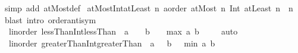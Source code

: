 \begin{isabellebody}
%
\isatagproof
{}\isamarkupfalse%
\ {\isacharparenleft}{\kern0pt}simp\ add{\isacharcolon}{\kern0pt}\ atMost{\isacharunderscore}{\kern0pt}def{\isacharparenright}{\kern0pt}%
\endisatagproof
{\isafoldproof}%
%
\isadelimproof
\isanewline
%
\endisadelimproof
\isanewline
{}\isamarkupfalse%
\ atMost{\isacharunderscore}{\kern0pt}Int{\isacharunderscore}{\kern0pt}atLeast{\isacharcolon}{\kern0pt}\ {\isachardoublequoteopen}{\isacharbang}{\kern0pt}{\isacharbang}{\kern0pt}n{\isacharcolon}{\kern0pt}{\isacharcolon}{\kern0pt}\ {\isacharprime}{\kern0pt}a{\isacharcolon}{\kern0pt}{\isacharcolon}{\kern0pt}order{\isachardot}{\kern0pt}\ atMost\ n\ Int\ atLeast\ n\ {\isacharequal}{\kern0pt}\ {\isacharbraceleft}{\kern0pt}n{\isacharbraceright}{\kern0pt}{\isachardoublequoteclose}\isanewline
%
\isadelimproof
%
\endisadelimproof
%
\isatagproof
{}\isamarkupfalse%
\ {\isacharparenleft}{\kern0pt}blast\ intro{\isacharcolon}{\kern0pt}\ order{\isacharunderscore}{\kern0pt}antisym{\isacharparenright}{\kern0pt}%
\endisatagproof
{\isafoldproof}%
%
\isadelimproof
\isanewline
%
\endisadelimproof
\isanewline
{}\isamarkupfalse%
\ {\isacharparenleft}{\kern0pt}\ linorder{\isacharparenright}{\kern0pt}\ lessThan{\isacharunderscore}{\kern0pt}Int{\isacharunderscore}{\kern0pt}lessThan{\isacharcolon}{\kern0pt}\ {\isachardoublequoteopen}{\isacharbraceleft}{\kern0pt}\ a\ {\isacharless}{\kern0pt}{\isachardot}{\kern0pt}{\isachardot}{\kern0pt}{\isacharbraceright}{\kern0pt}\ {\isasyminter}\ {\isacharbraceleft}{\kern0pt}\ b\ {\isacharless}{\kern0pt}{\isachardot}{\kern0pt}{\isachardot}{\kern0pt}{\isacharbraceright}{\kern0pt}\ {\isacharequal}{\kern0pt}\ {\isacharbraceleft}{\kern0pt}\ max\ a\ b\ {\isacharless}{\kern0pt}{\isachardot}{\kern0pt}{\isachardot}{\kern0pt}{\isacharbraceright}{\kern0pt}{\isachardoublequoteclose}\isanewline
%
\isadelimproof
\ \ %
\endisadelimproof
%
\isatagproof
{}\isamarkupfalse%
\ auto%
\endisatagproof
{\isafoldproof}%
%
\isadelimproof
\isanewline
%
\endisadelimproof
\isanewline
{}\isamarkupfalse%
\ {\isacharparenleft}{\kern0pt}\ linorder{\isacharparenright}{\kern0pt}\ greaterThan{\isacharunderscore}{\kern0pt}Int{\isacharunderscore}{\kern0pt}greaterThan{\isacharcolon}{\kern0pt}\ {\isachardoublequoteopen}{\isacharbraceleft}{\kern0pt}{\isachardot}{\kern0pt}{\isachardot}{\kern0pt}{\isacharless}{\kern0pt}\ a{\isacharbraceright}{\kern0pt}\ {\isasyminter}\ {\isacharbraceleft}{\kern0pt}{\isachardot}{\kern0pt}{\isachardot}{\kern0pt}{\isacharless}{\kern0pt}\ b{\isacharbraceright}{\kern0pt}\ {\isacharequal}{\kern0pt}\ {\isacharbraceleft}{\kern0pt}{\isachardot}{\kern0pt}{\isachardot}{\kern0pt}{\isacharless}{\kern0pt}\ min\ a\ b{\isacharbraceright}{\kern0pt}{\isachardoublequoteclose}\isanewline

\end{isabellebody}
